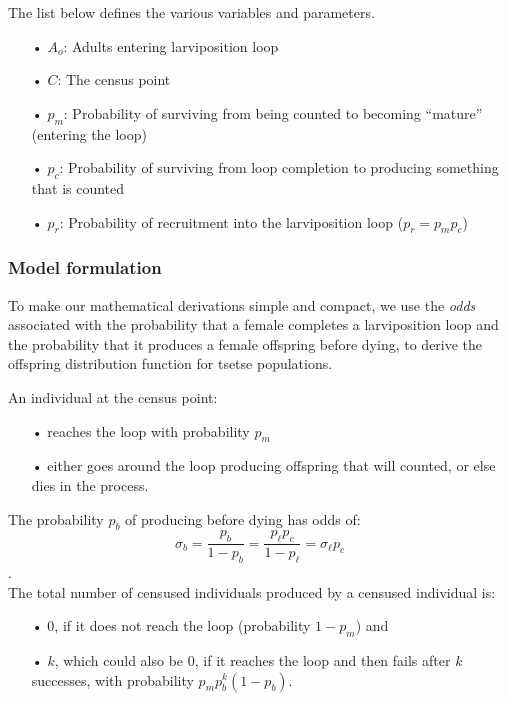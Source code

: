\documentclass[smallextended]{svjour3}
\begin{document}
The list below defines the various variables and parameters.

\begin{itemize}
	\item[•] $A_{o}$: Adults entering larviposition loop
	\item[•] $C$: The census point
	\item[•]$p_m$: Probability of surviving from being counted to becoming “mature” (entering the loop)
	\item[•]$p_c$: Probability of surviving from loop completion to producing something that is counted
	\item[•]$p_r$: Probability of recruitment into the larviposition loop ($p_r = p_mp_c$)
\end{itemize}

\subsubsection{Model formulation}
To make our mathematical derivations simple and compact, we use the \textit{odds} associated with the probability that a female completes a larviposition loop and the probability  that it produces a female offspring before dying, to derive the offspring distribution function for tsetse populations.  

An individual at the census point: 

\begin{itemize}
	\item [•] reaches the loop with probability $p_m$
	\item [•] either goes around the loop producing offspring that will counted, or else dies in the process.
\end{itemize}

The probability $p_b$ of producing before dying  has odds of: 
$$\sigma_b = \frac{p_b}{1-p_b} = \frac{p_\ell p_c}{1-p_\ell} = \sigma_\ell p_c$$.\\

The total number of censused individuals produced by a censused individual is: 

\begin{itemize}
	\item [•] 0, if it does not reach the loop (probability $1-p_m$) and
	\item [•] $k$, which could also be 0, if it reaches the loop and then fails after $k$ successes, with probability $p_m p_b^k (1-p_b)$.\\
\end{itemize}  
\end{document}

